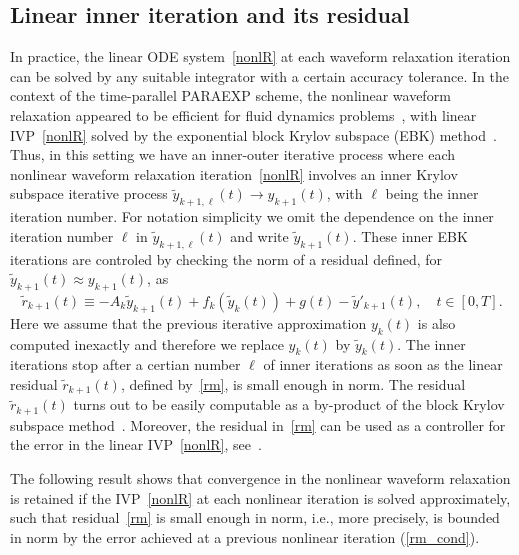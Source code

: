 \documentclass[sn-aps]{sn-jnl}
\theoremstyle{thmstyleone}%
\theoremstyle{thmstyletwo}%
\theoremstyle{thmstylethree}%
\begin{document}
\subsection{Linear inner iteration and its residual}
\label{s:lin_r}
In practice, the linear ODE system~\eqref{nonlR} at each waveform relaxation 
iteration can be solved
by any suitable integrator with a certain accuracy tolerance.  
In the context of the time-parallel PARAEXP scheme, 
the nonlinear waveform relaxation
appeared to be efficient for fluid dynamics problems~\cite{Kooij_ea2017,Kooij_ea2018},
with linear IVP~\eqref{nonlR} solved 
by the exponential block Krylov subspace (EBK) method~\cite{Botchev2013}. 
Thus, in this setting we have an inner-outer iterative process where 
each nonlinear waveform relaxation iteration~\eqref{nonlR} involves an inner Krylov
subspace iterative process $\tilde{y}_{k+1,\ell}(t)\rightarrow y_{k+1}(t)$,
with $\ell$ being the inner iteration number.
For notation simplicity we omit the dependence on the inner iteration number $\ell$
in $\tilde{y}_{k+1,\ell}(t)$ and write $\tilde{y}_{k+1}(t)$.
These inner EBK iterations are controled by checking the norm of a residual
defined, for $\tilde{y}_{k+1}(t)\approx y_{k+1}(t)$, as
\begin{equation}
\label{rm}
\tilde{r}_{k+1}(t)\equiv -A_k\tilde{y}_{k+1}(t)+ f_k(\tilde{y}_k(t)) + g(t) 
-\tilde{y}'_{k+1}(t), \quad t\in[0,T].
\end{equation}
Here we assume that 
the previous iterative approximation $y_k(t)$ is also computed inexactly and
therefore we replace $y_k(t)$ by $\tilde{y}_k(t)$.
The inner iterations stop after a certian number $\ell$ of inner 
iterations as soon as the linear residual $\tilde{r}_{k+1}(t)$,
defined by~\eqref{rm}, is small enough in norm.
The residual  $\tilde{r}_{k+1}(t)$ turns out to be easily computable
as a by-product of the block Krylov subspace method~\cite{Botchev2013}.
Moreover, the residual in~\eqref{rm} can be used as a controller 
for the error in the linear IVP~\eqref{nonlR}, 
see~\cite[relation~16]{Botchev2013}.  

The following result shows that convergence in the nonlinear waveform relaxation
is retained if the IVP~\eqref{nonlR} at each nonlinear iteration is solved 
approximately, such that residual~\eqref{rm} is small enough in norm,
i.e., more precisely, is bounded in norm by the error achieved at
a previous nonlinear iteration (\eqref{rm_cond}).  
\end{document}

